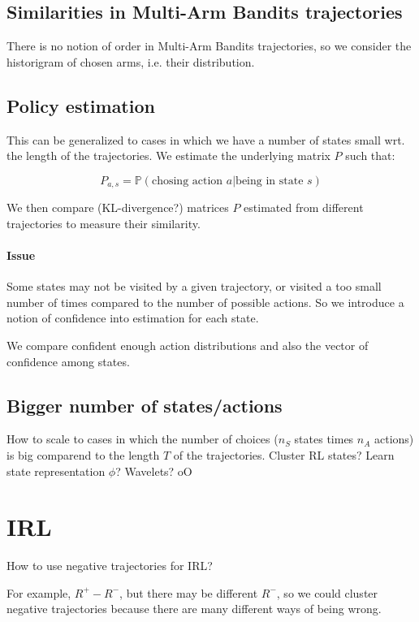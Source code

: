 \documentclass{article}
\begin{document}
\subsection{Similarities in Multi-Arm Bandits trajectories}

There is no notion of order in Multi-Arm Bandits trajectories, so we consider the historigram of chosen arms, i.e. their distribution.

\subsection{Policy estimation}

This can be generalized to cases in which we have a number of states small wrt. the length of the trajectories. We estimate the underlying matrix $P$ such that:

\[
P_{a,s} = \mathbb P(\text{chosing action } a | \text{being in state } s)
\]

We then compare (KL-divergence?) matrices $P$ estimated from different trajectories to measure their similarity.

\paragraph{Issue} Some states may not be visited by a given trajectory, or visited a too small number of times compared to the number of possible actions. So we introduce a notion of confidence into estimation for each state.

We compare confident enough action distributions and also the vector of confidence among states.

\subsection{Bigger number of states/actions}

How to scale to cases in which the number of choices ($n_S$ states times $n_A$ actions) is big comparend to the length $T$ of the trajectories. Cluster RL states? Learn state representation $\phi$? Wavelets? oO

\section{IRL}

How to use negative trajectories for IRL?

For example, $R^+ - R^-$, but there may be different $R^-$, so we could cluster negative trajectories because there are many different ways of being wrong.
\end{document}
